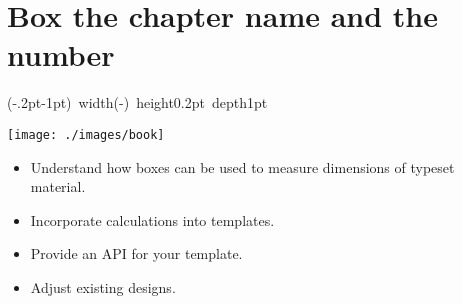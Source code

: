\section{Box the chapter name and the number}
\clearpage

\newpage

\makeatletter
\parindent0pt
\newlength\templength
\newlength\tempdepth
\newsavebox\chapterblock

\savebox{}

\setlength\templength{\the\wd\chapterblock}
\setlength\tempdepth{\the\dp\chapterblock}


\usebox\chapterblock%
\lower\dimexpr(\tempdepth-.2pt-1pt)\hbox{%
\vrule width\dimexpr(\columnwidth-\templength) height0.2pt depth1pt}\par
\vspace*{6.5pt}

\addtolength{\templength}{-1.5cm}
\hspace*{\templength}{\Huge\bfseries\arial Measuring Capacity}\par
\vspace*{36pt}
\texttt{[image: ./images/book]}\raisebox{10pt}{\rule{\textwidth-\templength}{0.4pt}}\vskip-3pt
\hspace*{\templength}{\bfseries \LARGE\sffamily After reading this chapter you will be able to:}
\bigskip


\hspace*{\dimexpr(\templength-20pt)\relax}\begin{minipage}{\textwidth-\templength}
\begin{itemize}\arial
\item Understand how boxes can be used to measure dimensions of typeset material.
\item Incorporate calculations into templates.
\item Provide an API for your template.
\item Adjust existing designs.
\end{itemize}
\vspace*{24pt}
\end{minipage}
\chapterafterheading@cx
\arial


